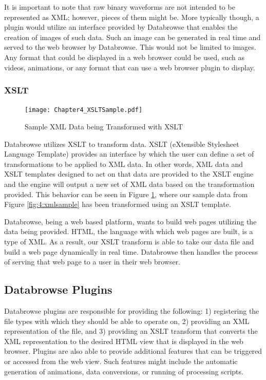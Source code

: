 \documentclass[10pt]{article}
\begin{document}
It is important to note that raw binary waveforms are not intended to be represented as XML; however, pieces of them might be.  More typically though, a plugin would utilize an interface provided by Databrowse that enables the creation of images of such data.  Such an image can be generated in real time and served to the web browser by Databrowse.  This would not be limited to images.  Any format that could be displayed in a web browser could be used, such as videos, animations, or any format that can use a web browser plugin to display.

\subsubsection{XSLT}

\begin{figure}
	\texttt{[image: Chapter4\_XSLTSample.pdf]}
	\caption{Sample XML Data being Transformed with XSLT}
	\label{fig:4:xsltsample}
\end{figure}

Databrowse utilizes XSLT to transform data.  XSLT (eXtensible Stylesheet Language Template) provides an interface by which the user can define a set of transformations to be applied to XML data.  In other words, XML data and XSLT templates designed to act on that data are provided to the XSLT engine and the engine will output a new set of XML data based on the transformation provided.  This behavior can be seen in Figure \ref{fig:4:xsltsample}, where our sample data from Figure \ref{fig:4:xmlsample} has been transformed using an XSLT template.

Databrowse, being a web based platform, wants to build web pages utilizing the data being provided.  HTML, the language with which web pages are built, is a type of XML.  As a result, our XSLT transform is able to take our data file and build a web page dynamically in real time.  Databrowse then handles the process of serving that web page to a user in their web browser.

\subsection{Databrowse Plugins}

Databrowse plugins are responsible for providing the following:  1) registering the file types with which they should be able to operate on, 2) providing an XML representation of the file, and 3) providing an XSLT transform that converts the XML representation to the desired HTML view that is displayed in the web browser.  Plugins are also able to provide additional features that can be triggered or accessed from the web view.  Such features might include the automatic generation of animations, data conversions, or running of processing scripts.
\end{document}
